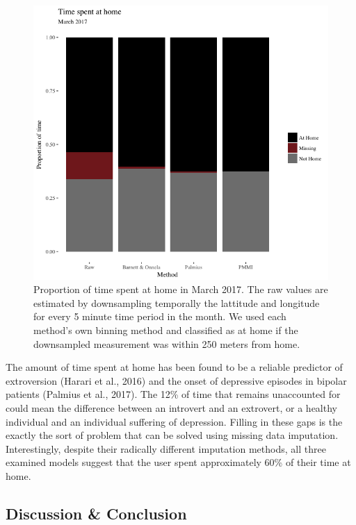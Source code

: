 \documentclass[man]{apa6}
\theoremstyle{definition}
\theoremstyle{definition}
\theoremstyle{definition}
\theoremstyle{remark}
\begin{document}
\begin{figure}
\includegraphics[width=1\linewidth]{img/timeUse} \caption{Proportion of time spent at home in March 2017. The raw values are estimated by downsampling temporally the lattitude and longitude for every 5 minute time period in the month. We used each method's own binning method and classified as at home if the downsampled measurement was within 250 meters from home.}\label{fig:aggrePlot}
\end{figure}

The amount of time spent at home has been found to be a reliable
predictor of extroversion (Harari et al., 2016) and the onset of
depressive episodes in bipolar patients (Palmius et al., 2017). The 12\%
of time that remains unaccounted for could mean the difference between
an introvert and an extrovert, or a healthy individual and an individual
suffering of depression. Filling in these gaps is the exactly the sort
of problem that can be solved using missing data imputation.
Interestingly, despite their radically different imputation methods, all
three examined models suggest that the user spent approximately 60\% of
their time at home.

\subsection{Discussion \& Conclusion}\label{discussion-conclusion}
\end{document}

